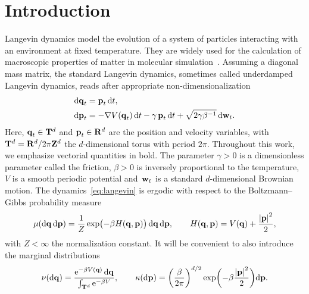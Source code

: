 \documentclass[11pt,a4paper]{article}
\begin{document}
\section{Introduction}%
Langevin dynamics model the evolution of a system of particles interacting with an environment at fixed temperature.
They are widely used for the calculation of macroscopic properties of matter in molecular simulation~\cite{MR2723222,allen2017computer}.
Assuming a diagonal mass matrix,
the standard Langevin dynamics, sometimes called underdamped Langevin dynamics,
reads after appropriate non-dimensionalization~\cite[Section 2.2.4]{MR2681239}
\begin{subequations}
\label{eq:langevin}
\begin{align}
    \label{eq:langevin_q}
    \mathrm d \boldsymbol{\mathbf q}_t &= \boldsymbol{\mathbf p}_t \, \mathrm d t, \\
    \label{eq:langevin_p}
    \mathrm d \boldsymbol{\mathbf p}_t &= - \nabla V(\boldsymbol{\mathbf q}_t) \, \mathrm d t - \gamma \, \boldsymbol{\mathbf p}_t \, \mathrm d t + \sqrt{2 \gamma \beta^{-1}} \, \mathrm d \boldsymbol{\mathbf w}_t.
\end{align}
\end{subequations}
Here, $\boldsymbol{\mathbf q}_t \in \mathbf T^d$ and $\boldsymbol{\mathbf p}_t \in \mathbf R^d$ are the position and velocity variables,
with~$\mathbf T^d = \mathbf R^d / 2\pi \mathbf Z^d$ the $d$-dimensional torus with period $2 \pi$.
Throughout this work, we emphasize vectorial quantities in bold.
The parameter $\gamma > 0$ is a dimensionless parameter called the friction,
$\beta > 0$ is inversely proportional to the temperature,
$V$ is a smooth periodic potential
and~$\boldsymbol{\mathbf w}_t$ is a standard $d$-dimensional Brownian motion.
The dynamics~\eqref{eq:langevin} is ergodic with respect to the Boltzmann--Gibbs probability measure
\begin{equation}
    \label{eq:invariant_measure}
    \mu(\d \vect q \, \d \vect p) = \frac{1}{Z} \exp \bigl( - \beta H(\vect q, \vect p)  \bigr) \, \d \vect q \, \d \vect p,
    \qquad H(\vect q, \vect p) = V(\vect q) + \frac{\abs{\vect p}^2}{2},
\end{equation}
with $Z< \infty$ the normalization constant.
It will be convenient to also introduce the marginal distributions
\begin{equation}
    \label{eq:definition_prob_measures}
    \nu(\d \vect q) = \frac{\e^{- \beta V(\vect q)} \, \d \vect q}{\int_{\torus^d}\e^{-\beta V}},
    \qquad \kappa(\d \vect p) = \left( \frac{\beta}{2 \pi} \right)^{d/2}\exp \biggl( - \beta \frac{\abs*{\vect p}^2}{2} \biggr) \d \vect p.
\end{equation}
\end{document}
